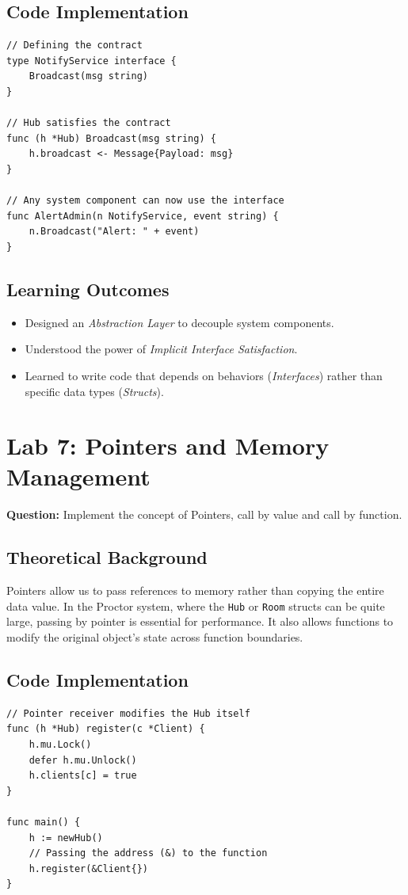 \documentclass[12pt,a4paper]{article}
\begin{document}
\subsection{Code Implementation}
\begin{lstlisting}
// Defining the contract
type NotifyService interface {
    Broadcast(msg string)
}

// Hub satisfies the contract
func (h *Hub) Broadcast(msg string) {
    h.broadcast <- Message{Payload: msg}
}

// Any system component can now use the interface
func AlertAdmin(n NotifyService, event string) {
    n.Broadcast("Alert: " + event)
}
\end{lstlisting}

\subsection{Learning Outcomes}
\begin{itemize}
    \item Designed an \textit{Abstraction Layer} to decouple system components.
    \item Understood the power of \textit{Implicit Interface Satisfaction}.
    \item Learned to write code that depends on behaviors (\textit{Interfaces}) rather than specific data types (\textit{Structs}).
\end{itemize}

\newpage
\section{Lab 7: Pointers and Memory Management}
\textbf{Question:} Implement the concept of Pointers, call by value and call by function.

\subsection{Theoretical Background}
Pointers allow us to pass references to memory rather than copying the entire data value. In the Proctor system, where the \texttt{Hub} or \texttt{Room} structs can be quite large, passing by pointer is essential for performance. It also allows functions to modify the original object's state across function boundaries.

\subsection{Code Implementation}
\begin{lstlisting}
// Pointer receiver modifies the Hub itself
func (h *Hub) register(c *Client) {
    h.mu.Lock()
    defer h.mu.Unlock()
    h.clients[c] = true
}

func main() {
    h := newHub()
    // Passing the address (&) to the function
    h.register(&Client{})
}
\end{lstlisting}
\end{document}
